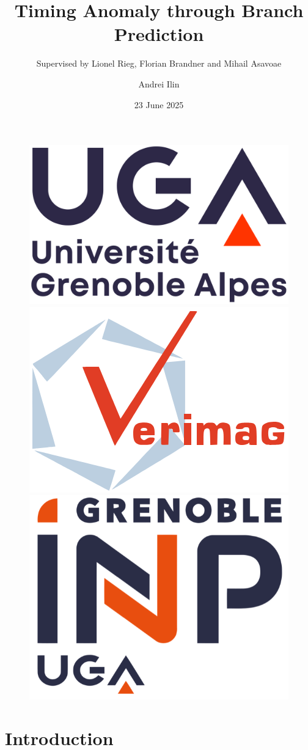 \documentclass{beamer}
\author{Andrei Ilin}
\title{Timing Anomaly through Branch Prediction}
\subtitle{Supervised by Lionel Rieg, Florian Brandner and Mihail Asavoae}
\institute{Université Grenoble Alpes}
\date{23 June 2025}
\begin{document}
\renewcommand{\figurename}{Fig.}

\begin{frame}
    \titlepage
    \begin{figure}[htpb]
        \begin{center}
            \includegraphics[width=0.2\linewidth]{pic/logo-uga.png}\hspace{1.5cm}
            \includegraphics[width=0.2\linewidth]{pic/logo-verimag.png}\hspace{1.5cm}
            \includegraphics[width=0.2\linewidth]{pic/logo-INP.png}
        \end{center}
    \end{figure}
\end{frame}

\begin{frame}
    \tableofcontents[sectionstyle=show,subsectionstyle=show/shaded/hide,subsubsectionstyle=show/shaded/hide]
\end{frame}

\section{Introduction}
\end{document}

